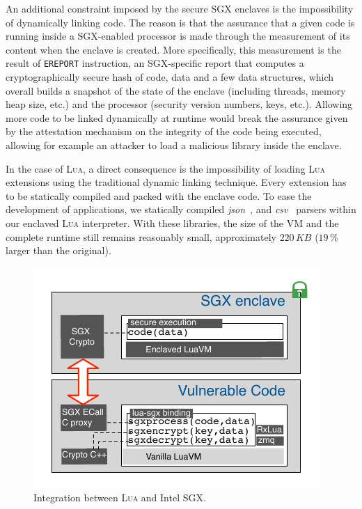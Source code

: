 An additional constraint imposed by the secure SGX enclaves is the impossibility of dynamically linking code.
The reason is that the assurance that a given code is running inside a SGX-enabled processor is made through the measurement of its content when the enclave is created.
More specifically, this measurement is the result of \texttt{EREPORT} instruction, an SGX-specific report that computes a cryptographically secure hash of code, data and a few data structures, which overall builds a snapshot of the state of the enclave (including threads, memory heap size, etc.) and the processor (security version numbers, keys, etc.).
Allowing more code to be linked dynamically at runtime would break the assurance given by the attestation mechanism on the integrity of the code being executed, allowing for example an attacker to load a malicious library inside the enclave.

In the case of \textsc{Lua}, a direct consequence is the impossibility of loading \textsc{Lua} extensions using the traditional dynamic linking technique.
Every extension has to be statically compiled and packed with the enclave code.
To ease the development of \SYS applications, we statically compiled \emph{json}~\cite{rfc7159}, and \emph{csv}~\cite{rfc4180} parsers within our enclaved \textsc{Lua} interpreter.
With these libraries, the size of the VM and the complete runtime still remains reasonably small, approximately $220\,KB$ ($19\,\%$ larger than the original).

\begin{figure}[t!]
  \centering
  \includegraphics[width=.9\linewidth]{images/arch-sgxlua}
  \caption{Integration between \textsc{Lua} and Intel{\textregistered} SGX.}
  \label{fig:arch-luasgx}
\end{figure}

